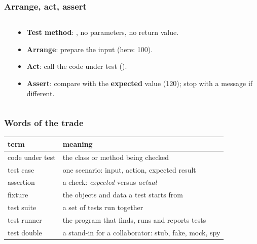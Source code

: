 \documentclass[aspectratio=169,10pt,compress]{beamer}
\begin{document}
\begin{frame}[t,fragile] \frametitle{Arrange, act, assert}
  \begin{columns}[T]
    \begin{column}{0.5\textwidth}
    \end{column}
    \begin{column}{0.46\textwidth}
      \begin{itemize}\small
        \item \textbf{Test method}: , no parameters, no return value.
        \item \textbf{Arrange}: prepare the input (here: 100).
        \item \textbf{Act}: call the code under test ().
        \item \textbf{Assert}: compare with the \textbf{expected} value (120); stop with a message if different.
      \end{itemize}
    \end{column}
  \end{columns}
\end{frame}




\begin{frame}[t,fragile] \frametitle{Words of the trade}
  \begin{center}\small
  \begin{tabular}{lL{0.66\textwidth}}
    \toprule
    \textbf{term}       & \textbf{meaning} \\
    \midrule
    code under test     & the class or method being checked \\
    test case           & one scenario: input, action, expected result \\
    assertion           & a check: \emph{expected} versus \emph{actual} \\
    fixture             & the objects and data a test starts from \\
    test suite          & a set of tests run together \\
    test runner         & the program that finds, runs and reports tests \\
    test double         & a stand-in for a collaborator: stub, fake, mock, spy \\
    \bottomrule
  \end{tabular}
  \end{center}
\end{frame}
\end{document}
